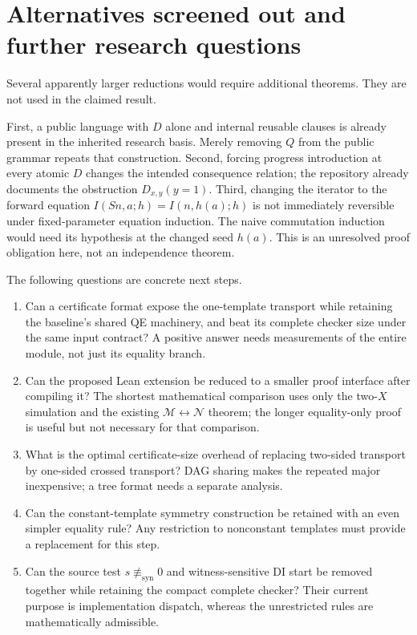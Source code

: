 \documentclass[11pt]{article}
\theoremstyle{definition}\newtheorem{definition}[theorem]{Definition}
\theoremstyle{remark}\newtheorem{remark}[theorem]{Remark}
\newcommand{\N}{\mathcal N}
\newcommand{\M}{\mathcal M}
\newcommand{\nolit}{\not\equiv_{\mathrm{syn}}}
\begin{document}
\section{Alternatives screened out and further research questions}

Several apparently larger reductions would require additional theorems.
They are not used in the claimed result.

First, a public language with $D$ alone and internal reusable clauses is
already present in the inherited research basis. Merely removing $Q$
from the public grammar repeats that construction. Second, forcing
progress introduction at every atomic $D$ changes the intended
consequence relation; the repository already documents the obstruction
$D_{x,y}(y=1)$. Third, changing the iterator to the forward equation
$I(Sn,a;h)=I(n,h(a);h)$ is not immediately reversible under fixed-parameter
equation induction. The naive commutation induction would need its
hypothesis at the changed seed $h(a)$. This is an unresolved proof
obligation here, not an independence theorem.

The following questions are concrete next steps.
\begin{enumerate}
\item Can a certificate format expose the one-template transport while
retaining the baseline's shared QE machinery, and beat its complete
checker size under the same input contract? A positive answer needs
measurements of the entire module, not just its equality branch.
\item Can the proposed Lean extension be reduced to a smaller proof
interface after compiling it? The shortest mathematical comparison uses
only the two-$X$ simulation and the existing $\M\leftrightarrow\N$
theorem; the longer equality-only proof is useful but not necessary for
that comparison.
\item What is the optimal certificate-size overhead of replacing
two-sided transport by one-sided crossed transport? DAG sharing makes
the repeated major inexpensive; a tree format needs a separate analysis.
\item Can the constant-template symmetry construction be retained with
an even simpler equality rule? Any restriction to nonconstant templates
must provide a replacement for this step.
\item Can the source test $s\nolit0$ and witness-sensitive DI start be
removed together while retaining the compact complete checker? Their
current purpose is implementation dispatch, whereas the unrestricted
rules are mathematically admissible.
\end{enumerate}
\end{document}
